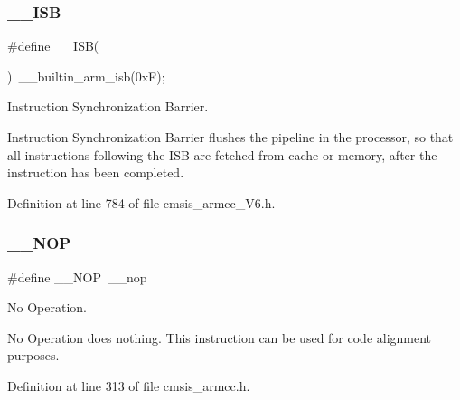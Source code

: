 \subsubsection{\texorpdfstring{\+\_\+\+\_\+\+I\+SB}{\_\_ISB}\hspace{0.1cm}{\footnotesize\ttfamily [2/2]}}
{\footnotesize\ttfamily \#define \+\_\+\+\_\+\+I\+SB(\begin{DoxyParamCaption}{ }\end{DoxyParamCaption})~\+\_\+\+\_\+builtin\+\_\+arm\+\_\+isb(0x\+F);}



Instruction Synchronization Barrier. 

Instruction Synchronization Barrier flushes the pipeline in the processor, so that all instructions following the I\+SB are fetched from cache or memory, after the instruction has been completed. 

Definition at line 784 of file cmsis\+\_\+armcc\+\_\+\+V6.\+h.

\mbox{\label{group___c_m_s_i_s___core___instruction_interface_gabd585ddc865fb9b7f2493af1eee1a572}} 
\subsubsection{\texorpdfstring{\+\_\+\+\_\+\+N\+OP}{\_\_NOP}\hspace{0.1cm}{\footnotesize\ttfamily [1/2]}}
{\footnotesize\ttfamily \#define \+\_\+\+\_\+\+N\+OP~\+\_\+\+\_\+nop}



No Operation. 

No Operation does nothing. This instruction can be used for code alignment purposes. 

Definition at line 313 of file cmsis\+\_\+armcc.\+h.

\mbox{\label{group___c_m_s_i_s___core___instruction_interface_gabd585ddc865fb9b7f2493af1eee1a572}} 
